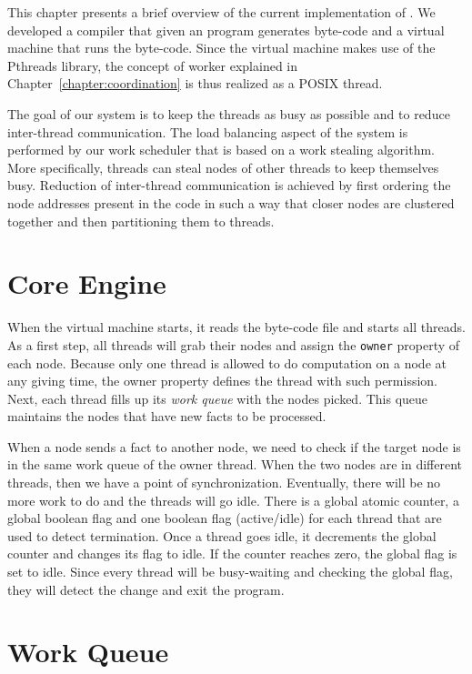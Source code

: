 This chapter presents a brief overview of the current implementation of \lang.
We developed a compiler that given an \lang program generates \lang byte-code and a virtual machine that runs the byte-code.
Since the virtual machine makes use of the Pthreads library, the concept of worker explained in Chapter~\ref{chapter:coordination} is thus realized as a POSIX thread.

The goal of our system is to keep the threads as busy as possible and to reduce inter-thread communication.
The load balancing aspect of the system is performed by our work scheduler that is based on a work
stealing algorithm. More specifically, threads can steal nodes of other threads to keep themselves busy.
Reduction of inter-thread communication is achieved by first ordering the node addresses present in the code
in such a way that closer nodes are clustered together and then partitioning them to threads.

\section{Core Engine}

When the virtual machine starts, it reads the byte-code file and starts all threads.
As a first step, all threads will grab their nodes and assign the \texttt{owner} property of each node.
Because only one thread is allowed to do computation on a node at any giving time, the owner property
defines the thread with such permission.
Next, each thread fills up its \emph{work queue} with the nodes picked. This queue
maintains the nodes that have new facts to be processed.

When a node sends a fact to another node, we need to check if the target node is in the same work queue of the owner thread.
When the two nodes are in different threads, then we have a point of synchronization. Eventually,
there will be no more work to do and the threads will go idle. There is a global atomic counter, a global
boolean flag and one boolean flag (active/idle) for each thread that are used to detect termination.
Once a thread goes idle, it decrements the global counter and changes its flag to idle. If the counter
reaches zero, the global flag is set to idle. Since every thread will be busy-waiting and checking
the global flag, they will detect the change and exit the program.

\section{Work Queue}

